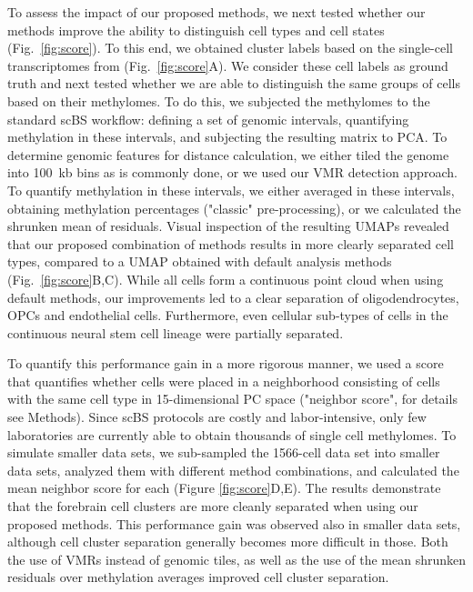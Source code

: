 \documentclass[twocolumn,10pt]{article}
\begin{document}
To assess the impact of our proposed methods, we next tested whether our methods improve the ability to distinguish cell types and cell states (Fig.~\ref{fig:score}).
To this end, we obtained cluster labels based on the single-cell transcriptomes from \citet{kremer_scnmt} (Fig.~\ref{fig:score}A).
We consider these cell labels as ground truth and next tested whether we are able to distinguish the same groups of cells based on their methylomes.
To do this, we subjected the methylomes to the standard scBS workflow:
defining a set of genomic intervals, quantifying methylation in these intervals, and subjecting the resulting matrix to PCA.
To determine genomic features for distance calculation, we either tiled the genome into 100~kb bins as is commonly done, or we used our VMR detection approach.
To quantify methylation in these intervals, we either averaged in these intervals, obtaining methylation percentages ("classic" pre-processing), or we calculated the shrunken mean of residuals.
Visual inspection of the resulting UMAPs revealed that our proposed combination of methods results in more clearly separated cell types, compared to a UMAP obtained with default analysis methods (Fig.~\ref{fig:score}B,C).
While all cells form a continuous point cloud when using default methods, our improvements led to a clear separation of oligodendrocytes, OPCs and endothelial cells.
Furthermore, even cellular sub-types of cells in the continuous neural stem cell lineage were partially separated.

To quantify this performance gain in a more rigorous manner, we used a score that quantifies whether cells were placed in a neighborhood consisting of cells with the same cell type in 15-dimensional PC space ("neighbor score", for details see Methods).
Since scBS protocols are costly and labor-intensive, only few laboratories are currently able to obtain thousands of single cell methylomes.
To simulate smaller data sets, we sub-sampled the 1566-cell data set into smaller data sets, analyzed them with different method combinations, and calculated the mean neighbor score for each (Figure \ref{fig:score}D,E).
The results demonstrate that the forebrain cell clusters are more cleanly separated when using our proposed methods.
This performance gain was observed also in smaller data sets, although cell cluster separation generally becomes more difficult in those.
Both the use of VMRs instead of genomic tiles, as well as the use of the mean shrunken residuals over methylation averages improved cell cluster separation.
\end{document}

